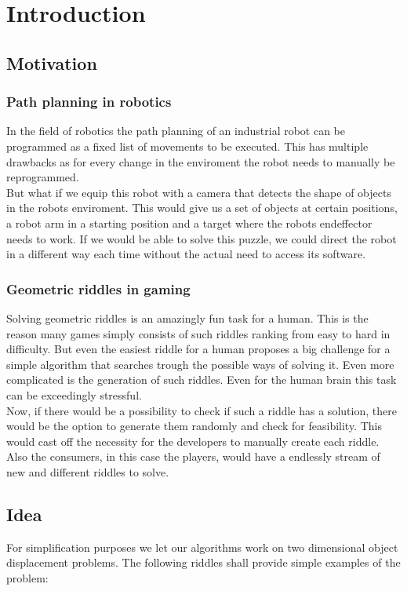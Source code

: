 \chapter{Introduction}
\label{cha:Introduction}

\section{Motivation}
\label{sec:Motivation}
\subsection{Path planning in robotics}
In the field of robotics the path planning of an industrial robot can be programmed as a fixed list of movements to be executed. This has multiple drawbacks as for every change in the enviroment the robot needs to manually be reprogrammed.\\
But what if we equip this robot with a camera that detects the shape of objects in the robots enviroment. This would give us a set of objects at certain positions, a robot arm in a starting position and a target where the robots endeffector needs to work. If we would be able to solve this puzzle, we could direct the robot in a different way each time without the actual need to access its software.


\subsection{Geometric riddles in gaming}
Solving geometric riddles is an amazingly fun task for a human. This is the reason many games simply consists of such riddles ranking from easy to hard in difficulty. But even the easiest riddle for a human proposes a big challenge for a simple algorithm that searches trough the possible ways of solving it. Even more complicated is the generation of such riddles. Even for the human brain this task can be exceedingly stressful.\\
 Now, if there would be a possibility to check if such a riddle has a solution, there would be the option to generate them randomly and check for feasibility. This would cast off the necessity for the developers to manually create each riddle. Also the consumers, in this case the players, would have a endlessly stream of new and different riddles to solve.


\section{Idea}
\label{sec:Idea}
For simplification purposes we let our algorithms work on two dimensional object displacement problems. The following riddles shall provide simple examples of the problem:\\

